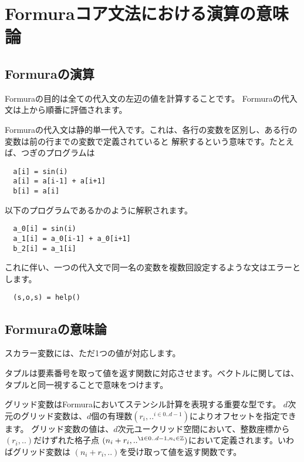 \documentclass{jsarticle}
\newcommand{\bbZ}{\mathbb{Z}}
\begin{document}
\newpage



\section{Formuraコア文法における演算の意味論}

%




\subsection{Formuraの演算}

Formuraの目的は全ての代入文の左辺の値を計算することです。
Formuraの代入文は上から順番に評価されます。

Formuraの代入文は静的単一代入です。これは、各行の変数を区別し、ある行の変数は前の行までの変数で定義されていると
解釈するという意味です。たとえば、つぎのプログラムは

\begin{lstlisting}
  a[i] = sin(i)
  a[i] = a[i-1] + a[i+1]
  b[i] = a[i]
\end{lstlisting}


以下のプログラムであるかのように解釈されます。
\begin{lstlisting}
  a_0[i] = sin(i)
  a_1[i] = a_0[i-1] + a_0[i+1]
  b_2[i] = a_1[i]
\end{lstlisting}


これに伴い、一つの代入文で同一名の変数を複数回設定するような文はエラーとします。
\begin{lstlisting}
  (s,o,s) = help()
\end{lstlisting}




\subsection{Formuraの意味論}


スカラー変数には、ただ1つの値が対応します。

タプルは要素番号を取って値を返す関数に対応させます。ベクトルに関しては、タプルと同一視することで意味をつけます。

グリッド変数はFormuraにおいてステンシル計算を表現する重要な型です。
$d$次元のグリッド変数は、$d$個の有理数$(r_i, .. ^{i \in 0 .. d-1})$によりオフセットを指定できます。
グリッド変数の値は、$d$次元ユークリッド空間において、整数座標から$(r_i, ..)$だけずれた格子点
$(n_i + r_i , .. ^{\i \in 0..d-1, n_i \in \bbZ})$において定義されます。いわばグリッド変数は
$(n_i + r_i , ..)$を受け取って値を返す関数です。
\end{document}
